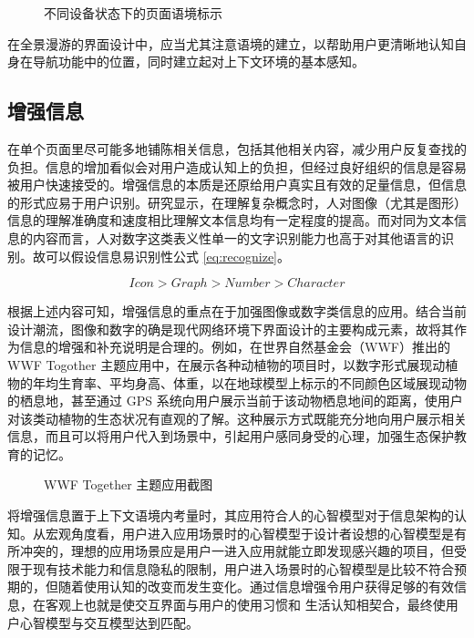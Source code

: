 \begin{figure}[htp]
\centering
{}
\caption{不同设备状态下的页面语境标示}
\label{fig:tab}
\end{figure}

在全景漫游的界面设计中，应当尤其注意语境的建立，以帮助用户更清晰地认知自身在导航功能中的位置，同时建立起对上下文环境的基本感知。

\subsection{增强信息}
在单个页面里尽可能多地铺陈相关信息，包括其他相关内容，减少用户反复查找的负担。信息的增加看似会对用户造成认知上的负担，但经过良好组织的信息是容易被用户快速接受的。增强信息的本质是还原给用户真实且有效的足量信息，但信息的形式应易于用户识别。研究显示，在理解复杂概念时，人对图像（尤其是图形）信息的理解准确度和速度相比理解文本信息均有一定程度的提高。而对同为文本信息的内容而言，人对数字这类表义性单一的文字识别能力也高于对其他语言的识别。故可以假设信息易识别性公式 \ref{eq:recognize}。

\begin{equation}
Icon > Graph > Number > Character 
\label{eq:recognize}
\end{equation}

根据上述内容可知，增强信息的重点在于加强图像或数字类信息的应用。结合当前设计潮流，图像和数字的确是现代网络环境下界面设计的主要构成元素，故将其作为信息的增强和补充说明是合理的。例如，在世界自然基金会（WWF）推出的 WWF Togother 主题应用中，在展示各种动植物的项目时，以数字形式展现动植物的年均生育率、平均身高、体重，以在地球模型上标示的不同颜色区域展现动物的栖息地，甚至通过 GPS 系统向用户展示当前于该动物栖息地间的距离，使用户对该类动植物的生态状况有直观的了解。这种展示方式既能充分地向用户展示相关信息，而且可以将用户代入到场景中，引起用户感同身受的心理，加强生态保护教育的记忆。

\begin{figure}[htp]
\centering
{}
\caption{WWF Together 主题应用截图}
\label{fig:wwf}
\end{figure}

将增强信息置于上下文语境内考量时，其应用符合人的心智模型对于信息架构的认知。从宏观角度看，用户进入应用场景时的心智模型于设计者设想的心智模型是有所冲突的，理想的应用场景应是用户一进入应用就能立即发现感兴趣的项目，但受限于现有技术能力和信息隐私的限制，用户进入场景时的心智模型是比较不符合预期的，但随着使用认知的改变而发生变化。通过信息增强令用户获得足够的有效信息，在客观上也就是使交互界面与用户的使用习惯和 生活认知相契合，最终使用户心智模型与交互模型达到匹配。

